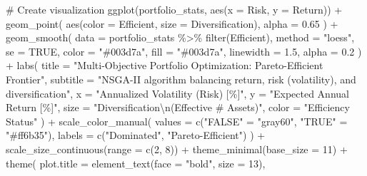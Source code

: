 \documentclass[
  10pt,
  a4paper,
]{article}
\newenvironment{Shaded}{\begin{snugshade}}{\end{snugshade}}
\newcommand{\AttributeTok}[1]{\textcolor[rgb]{0.40,0.45,0.13}{#1}}
\newcommand{\CommentTok}[1]{\textcolor[rgb]{0.37,0.37,0.37}{#1}}
\newcommand{\ConstantTok}[1]{\textcolor[rgb]{0.56,0.35,0.01}{#1}}
\newcommand{\DecValTok}[1]{\textcolor[rgb]{0.68,0.00,0.00}{#1}}
\newcommand{\FloatTok}[1]{\textcolor[rgb]{0.68,0.00,0.00}{#1}}
\newcommand{\FunctionTok}[1]{\textcolor[rgb]{0.28,0.35,0.67}{#1}}
\newcommand{\NormalTok}[1]{\textcolor[rgb]{0.00,0.23,0.31}{#1}}
\newcommand{\OtherTok}[1]{\textcolor[rgb]{0.00,0.23,0.31}{#1}}
\newcommand{\SpecialCharTok}[1]{\textcolor[rgb]{0.37,0.37,0.37}{#1}}
\newcommand{\StringTok}[1]{\textcolor[rgb]{0.13,0.47,0.30}{#1}}
\begin{document}
\begin{Shaded}
\begin{Highlighting}[]
\CommentTok{\# Create visualization}
\FunctionTok{ggplot}\NormalTok{(portfolio\_stats, }\FunctionTok{aes}\NormalTok{(}\AttributeTok{x =}\NormalTok{ Risk, }\AttributeTok{y =}\NormalTok{ Return)) }\SpecialCharTok{+}
  \FunctionTok{geom\_point}\NormalTok{(}
    \FunctionTok{aes}\NormalTok{(}\AttributeTok{color =}\NormalTok{ Efficient, }\AttributeTok{size =}\NormalTok{ Diversification), }
    \AttributeTok{alpha =} \FloatTok{0.65}
\NormalTok{  ) }\SpecialCharTok{+}
  \FunctionTok{geom\_smooth}\NormalTok{(}
    \AttributeTok{data =}\NormalTok{ portfolio\_stats }\SpecialCharTok{\%\textgreater{}\%} \FunctionTok{filter}\NormalTok{(Efficient),}
    \AttributeTok{method =} \StringTok{"loess"}\NormalTok{, }
    \AttributeTok{se =} \ConstantTok{TRUE}\NormalTok{, }
    \AttributeTok{color =} \StringTok{"\#003d7a"}\NormalTok{, }
    \AttributeTok{fill =} \StringTok{"\#003d7a"}\NormalTok{,}
    \AttributeTok{linewidth =} \FloatTok{1.5}\NormalTok{,}
    \AttributeTok{alpha =} \FloatTok{0.2}
\NormalTok{  ) }\SpecialCharTok{+}
  \FunctionTok{labs}\NormalTok{(}
    \AttributeTok{title =} \StringTok{"Multi{-}Objective Portfolio Optimization: Pareto{-}Efficient Frontier"}\NormalTok{,}
    \AttributeTok{subtitle =} \StringTok{"NSGA{-}II algorithm balancing return, risk (volatility), and diversification"}\NormalTok{,}
    \AttributeTok{x =} \StringTok{"Annualized Volatility (Risk) [\%]"}\NormalTok{,}
    \AttributeTok{y =} \StringTok{"Expected Annual Return [\%]"}\NormalTok{,}
    \AttributeTok{size =} \StringTok{"Diversification}\SpecialCharTok{\textbackslash{}n}\StringTok{(Effective \# Assets)"}\NormalTok{,}
    \AttributeTok{color =} \StringTok{"Efficiency Status"}
\NormalTok{  ) }\SpecialCharTok{+}
  \FunctionTok{scale\_color\_manual}\NormalTok{(}
    \AttributeTok{values =} \FunctionTok{c}\NormalTok{(}\StringTok{"FALSE"} \OtherTok{=} \StringTok{"gray60"}\NormalTok{, }\StringTok{"TRUE"} \OtherTok{=} \StringTok{"\#ff6b35"}\NormalTok{),}
    \AttributeTok{labels =} \FunctionTok{c}\NormalTok{(}\StringTok{"Dominated"}\NormalTok{, }\StringTok{"Pareto{-}Efficient"}\NormalTok{)}
\NormalTok{  ) }\SpecialCharTok{+}
  \FunctionTok{scale\_size\_continuous}\NormalTok{(}\AttributeTok{range =} \FunctionTok{c}\NormalTok{(}\DecValTok{2}\NormalTok{, }\DecValTok{8}\NormalTok{)) }\SpecialCharTok{+}
  \FunctionTok{theme\_minimal}\NormalTok{(}\AttributeTok{base\_size =} \DecValTok{11}\NormalTok{) }\SpecialCharTok{+}
  \FunctionTok{theme}\NormalTok{(}
    \AttributeTok{plot.title =} \FunctionTok{element\_text}\NormalTok{(}\AttributeTok{face =} \StringTok{"bold"}\NormalTok{, }\AttributeTok{size =} \DecValTok{13}\NormalTok{),}

\end{Highlighting}
\end{Shaded}
\end{document}
